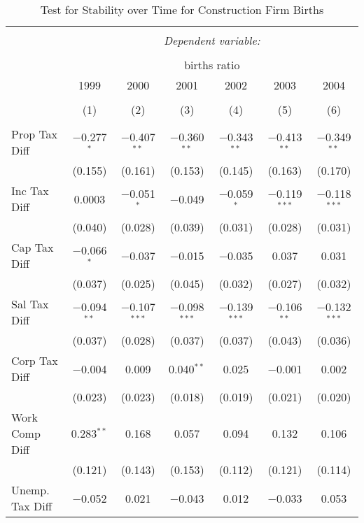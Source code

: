 
\begin{table}[!htbp] \centering 
  \caption{Test for Stability over Time for  Construction Firm Births} 
  \label{23year} 
\small 
\begin{tabular}{@{\extracolsep{5pt}}lcccccc} 
\\[-1.8ex]\hline 
\hline \\[-1.8ex] 
 & \multicolumn{6}{c}{\textit{Dependent variable:}} \\ 
\cline{2-7} 
\\[-1.8ex] & \multicolumn{6}{c}{births ratio} \\ 
 & 1999 & 2000 & 2001 & 2002 & 2003 & 2004 \\ 
\\[-1.8ex] & (1) & (2) & (3) & (4) & (5) & (6)\\ 
\hline \\[-1.8ex] 
 Prop Tax Diff & $-$0.277$^{*}$ & $-$0.407$^{**}$ & $-$0.360$^{**}$ & $-$0.343$^{**}$ & $-$0.413$^{**}$ & $-$0.349$^{**}$ \\ 
  & (0.155) & (0.161) & (0.153) & (0.145) & (0.163) & (0.170) \\ 
  Inc Tax Diff & 0.0003 & $-$0.051$^{*}$ & $-$0.049 & $-$0.059$^{*}$ & $-$0.119$^{***}$ & $-$0.118$^{***}$ \\ 
  & (0.040) & (0.028) & (0.039) & (0.031) & (0.028) & (0.031) \\ 
  Cap Tax Diff & $-$0.066$^{*}$ & $-$0.037 & $-$0.015 & $-$0.035 & 0.037 & 0.031 \\ 
  & (0.037) & (0.025) & (0.045) & (0.032) & (0.027) & (0.032) \\ 
  Sal Tax Diff & $-$0.094$^{**}$ & $-$0.107$^{***}$ & $-$0.098$^{***}$ & $-$0.139$^{***}$ & $-$0.106$^{**}$ & $-$0.132$^{***}$ \\ 
  & (0.037) & (0.028) & (0.037) & (0.037) & (0.043) & (0.036) \\ 
  Corp Tax Diff & $-$0.004 & 0.009 & 0.040$^{**}$ & 0.025 & $-$0.001 & 0.002 \\ 
  & (0.023) & (0.023) & (0.018) & (0.019) & (0.021) & (0.020) \\ 
  Work Comp Diff & 0.283$^{**}$ & 0.168 & 0.057 & 0.094 & 0.132 & 0.106 \\ 
  & (0.121) & (0.143) & (0.153) & (0.112) & (0.121) & (0.114) \\ 
  Unemp. Tax Diff & $-$0.052 & 0.021 & $-$0.043 & 0.012 & $-$0.033 & 0.053 \\ 

\end{tabular}
\end{table}
